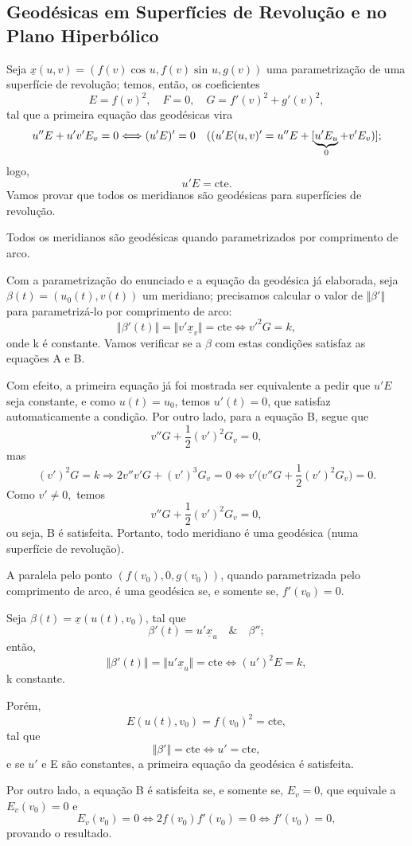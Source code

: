 \documentclass[../differential_geometry.tex]{subfiles}
\begin{document}
\subsection{Geodésicas em Superfícies de Revolução e no Plano Hiperbólico}
Seja \(\underline{x}(u, v)=(f(v)\cos^{}{u}, f(v)\sin^{}{u}, g(v))\) uma parametrização de uma superfície de revolução; temos, então, os coeficientes
\[
	E = f(v)^{2}, \quad F = 0, \quad G = f'(v)^{2} + g'(v)^{2},
\]
tal que a primeira equação das geodésicas vira
\[
	u''E + u'v'E_v = 0 \Longleftrightarrow (u'E)'=0 \quad ((u'E(u, v)'=u''E + [\underbrace{u'E_u}_{\mathclap{0}} + v'E_v)];
\]
logo,
\[
	u'E = \mathrm{cte}.
\]
Vamos provar que todos os meridianos são geodésicas para superfícies de revolução.
\begin{lemma*}
	Todos os meridianos são geodésicas quando parametrizados por comprimento de arco.
\end{lemma*}
\begin{proof*}
	Com a parametrização do enunciado e a equação da geodésica já elaborada, seja \(\beta (t) = (u_{0}(t), v(t))\) um meridiano; precisamos calcular o valor de \(\Vert \beta ' \Vert\) para parametrizá-lo por comprimento de arco:
	\[
		\Vert \beta '(t) \Vert=\Vert v'\underline{x}_v \Vert = \mathrm{cte} \Longleftrightarrow v'^{2}G = k,
	\]
	onde k é constante. Vamos verificar se a \(\beta \) com estas condições satisfaz as equações A e B.

	Com efeito, a primeira equação já foi mostrada ser equivalente a pedir que \(u'E\) seja constante, e como \(u(t) = u_{0}\), temos \(u'(t) = 0\), que satisfaz automaticamente a condição. Por outro lado, para a equação B, segue que
	\[
		v''G + \frac{1}{2}(v')^{2}G_v = 0,
	\]
	mas
	\[
		(v')^{2}G = k \Rightarrow 2v''v'G + (v')^{3}G_v = 0 \Longleftrightarrow v'\biggl(v''G + \frac{1}{2}(v')^{2}G_v\biggr) = 0.
	\]
	Como \(v'\neq 0,\) temos
	\[
		v''G + \frac{1}{2}(v')^{2}G_v = 0,
	\]
	ou seja, B é satisfeita. Portanto, todo meridiano é uma geodésica (numa superfície de revolução). \qedsymbol
\end{proof*}
\begin{lemma*}
	A paralela pelo ponto \((f(v_{0}), 0, g(v_{0}))\), quando parametrizada pelo comprimento de arco, é uma geodésica se, e somente se, \(f'(v_{0}) = 0\).
\end{lemma*}
\begin{proof*}
	Seja \(\beta (t) = \underline{x}(u(t), v_{0})\), tal que
	\[
		\beta '(t) = u'\underline{x}_u \quad\&\quad \beta '';
	\]
	então,
	\[
		\Vert \beta '(t) \Vert=\Vert u'\underline{x}_u \Vert = \mathrm{cte} \Longleftrightarrow (u')^{2}E = k,
	\]
	k constante.

	Porém,
	\[
		E(u(t),v_{0}) = f(v_{0})^{2} = \mathrm{cte},
	\]
	tal que
	\[
		\Vert \beta ' \Vert = \mathrm{cte}\Longleftrightarrow u'=\mathrm{cte},
	\]
	e se \(u'\) e E são constantes, a primeira equação da geodésica é satisfeita.

	Por outro lado, a equação B é satisfeita se, e somente se, \(E_v = 0\), que equivale a \(E_v(v_{0}) = 0\) e
	\[
		E_v(v_{0}) = 0 \Longleftrightarrow 2f(v_{0})f'(v_{0}) = 0 \Longleftrightarrow f'(v_{0})=0,
	\]
	provando o resultado. \qedsymbol
\end{proof*}
\end{document}
